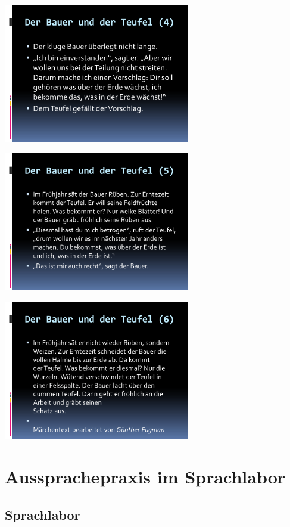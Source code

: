 \documentclass[
  letterpaper,
]{scrbook}
\begin{document}
\includegraphics[width=3.2in,height=\textheight]{./pictures/satzakzentuierung/satzakzent_Diapozitiv14.PNG}

\includegraphics[width=3.2in,height=\textheight]{./pictures/satzakzentuierung/satzakzent_Diapozitiv15.PNG}

\includegraphics[width=3.2in,height=\textheight]{./pictures/satzakzentuierung/satzakzent_Diapozitiv16.PNG}

\part{Aussprachepraxis im Sprachlabor}

\hypertarget{sec-sprachlabor}{%
\chapter{Sprachlabor}\label{sec-sprachlabor}}
\end{document}
